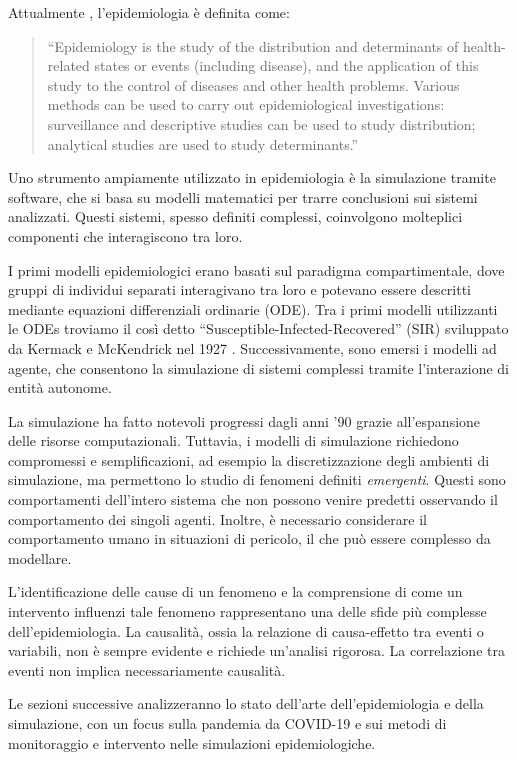 Attualmente \cite{ward2012oxford}, l'epidemiologia è definita come:
\begin{quote}
    ``Epidemiology is the study of the distribution and determinants of 
	health-related states or events (including disease), and the 
	application of this study to the control of diseases and other 
	health problems. Various methods can be used to carry out 
	epidemiological investigations: surveillance and descriptive studies 
	can be used to study distribution; analytical studies are used to 
	study determinants.''
\end{quote}

Uno strumento ampiamente utilizzato in epidemiologia è la simulazione 
tramite software, che si basa su modelli matematici per trarre conclusioni 
sui sistemi analizzati. Questi sistemi, spesso definiti complessi, 
coinvolgono molteplici componenti che interagiscono tra loro.

I primi modelli epidemiologici erano basati sul paradigma compartimentale, 
dove gruppi di individui separati interagivano tra loro e potevano essere 
descritti mediante equazioni differenziali ordinarie (ODE). Tra i primi 
modelli utilizzanti le ODEs troviamo il così detto 
``Susceptible-Infected-Recovered'' (SIR) sviluppato da 
Kermack e McKendrick nel 1927 \cite{kermack1927contribution}. 
Successivamente, sono emersi i modelli ad agente, che consentono la 
simulazione di sistemi complessi tramite l'interazione di entità autonome.

La simulazione ha fatto notevoli progressi dagli anni '90 grazie 
all'espansione delle risorse computazionali. Tuttavia, i modelli di 
simulazione richiedono compromessi e semplificazioni, ad esempio la 
discretizzazione degli ambienti di simulazione, ma permettono lo 
studio di fenomeni definiti \emph{emergenti}. Questi sono comportamenti 
dell'intero sistema che non possono venire predetti osservando 
il comportamento dei singoli agenti. Inoltre, è necessario considerare 
il comportamento umano in situazioni di pericolo, il che può 
essere complesso da modellare.

L'identificazione delle cause di un fenomeno e la comprensione di come un 
intervento influenzi tale fenomeno rappresentano una delle sfide più 
complesse dell'epidemiologia. La causalità, ossia la relazione di 
causa-effetto tra eventi o variabili, non è sempre evidente e richiede 
un'analisi rigorosa. La correlazione tra eventi non implica 
necessariamente causalità.

Le sezioni successive analizzeranno lo stato dell'arte dell'epidemiologia 
e della simulazione, con un focus sulla pandemia da COVID-19 e sui metodi 
di monitoraggio e intervento nelle simulazioni epidemiologiche.